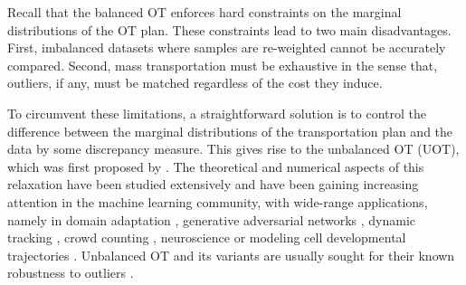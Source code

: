 Recall that the balanced OT enforces hard constraints on the marginal distributions
of the OT plan. These constraints lead to two main disadvantages. First,
imbalanced datasets where samples are re-weighted cannot be accurately compared.
Second, mass transportation must be exhaustive in the sense that,
outliers, if any, must be matched regardless of the cost they induce.

To circumvent these limitations, a straightforward solution is to control
the difference between the marginal distributions of the transportation plan
and the data by some discrepancy measure. This gives rise to the unbalanced OT (UOT),
which was first proposed by \citet{Benamou03}.
The theoretical and numerical aspects of this relaxation
have been studied extensively \citep{Liero18,Chizat18b,Chizat18a,Khiem20}
and have been gaining increasing attention in the machine learning community,
with wide-range applications, namely in domain adaptation \citep{Fatras21},
generative adversarial networks \citep{Balaji20, Yang19}, dynamic tracking \citep{Lee19},
crowd counting \citep{Ma21}, neuroscience \citep{janati2019group, bazeille2019} or
modeling cell developmental trajectories \citep{Schiebinger19}.
Unbalanced OT and its variants are usually sought for
their known robustness to outliers \citep{Mukherjee21,Balaji20,Fatras21,Nietert22,Le21}.

